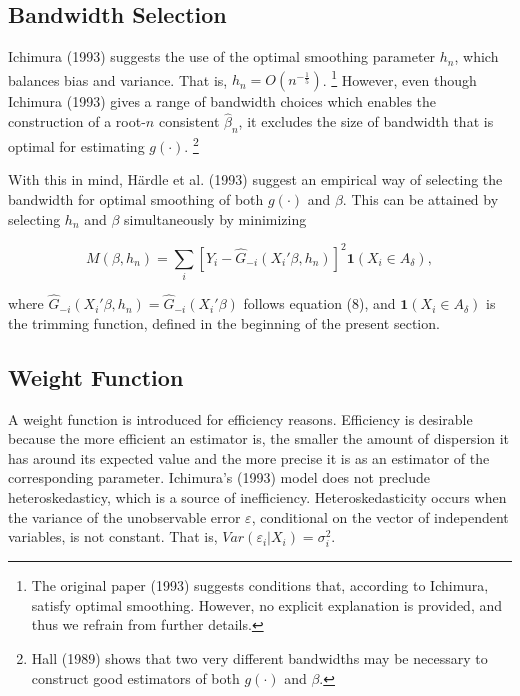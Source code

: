 

\subsection{Bandwidth Selection} %
\label{sub:Bandwidth Selection}

Ichimura (1993) \cite{[6]} suggests the use of the optimal smoothing parameter $h_n$, which balances bias and variance. That is, $h_n = O(n^{-\frac{1}{5}})$. \footnote{The original paper (1993) \cite{[6]} suggests conditions that, according to Ichimura, satisfy optimal smoothing. However, no explicit explanation is provided, and thus we refrain from further details.} However, even though Ichimura (1993) \cite{[6]} gives a range of bandwidth choices which enables the construction of a root-$n$ consistent $\hat{\beta}_n$, it excludes the size of bandwidth that is optimal for estimating $g(\cdot)$. \footnote{Hall (1989) \cite{[17]} shows that two very different bandwidths may be necessary to construct good estimators of both $g(\cdot)$ and $\beta$.}
 
With this in mind, H{\"a}rdle et al. (1993) \cite{[18]} suggest an empirical way of selecting the bandwidth for optimal smoothing of both $g(\cdot)$ and $\beta$. This can be attained by selecting $h_n$ and $\beta$ simultaneously by minimizing

\begin{equation}
M(\beta, h_n) = \sum_i \left[ Y_i - \hat{G}_{-i}(X_i'\beta, h_n) \right]^2\mathbf{1}{(X_i \in A_\delta)},
\end{equation}

where $\hat{G}_{-i}(X_i'\beta, h_n) = \hat{G}_{-i}(X_i'\beta)$ follows equation (8), and $\mathbf{1}{(X_i \in A_\delta)}$ is the trimming function, defined in the beginning of the present section.

\subsection{Weight Function} %
\label{sub:Weight Function}

A weight function is introduced for efficiency reasons. Efficiency is desirable because the more efficient an estimator is, the smaller the amount of dispersion it has around its expected value and the more precise it is as an estimator of the corresponding parameter. Ichimura's (1993) \cite{[6]} model does not preclude heteroskedasticy, which is a source of inefficiency.  Heteroskedasticity occurs when the variance of the unobservable error $\varepsilon$, conditional on  the vector of independent variables, is not constant. That is, $Var(\varepsilon_i|X_i) = \sigma_i^2$.  

